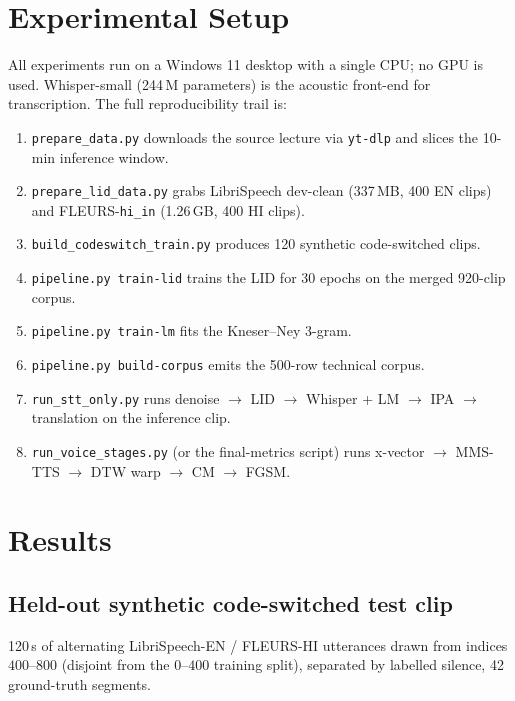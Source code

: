 \documentclass[conference]{IEEEtran}
\begin{document}
\section{Experimental Setup}
All experiments run on a Windows 11 desktop with a single CPU; no
GPU is used. Whisper-small (244\,M parameters) is the acoustic
front-end for transcription. The full reproducibility trail is:

\begin{enumerate}\itemsep1pt
\item \texttt{prepare\_data.py} downloads the source lecture via
      \texttt{yt-dlp} and slices the 10-min inference window.
\item \texttt{prepare\_lid\_data.py} grabs LibriSpeech dev-clean (337\,MB, 400 EN clips) and FLEURS-\texttt{hi\_in} (1.26\,GB, 400 HI clips).
\item \texttt{build\_codeswitch\_train.py} produces 120 synthetic code-switched clips.
\item \texttt{pipeline.py train-lid} trains the LID for 30 epochs
      on the merged 920-clip corpus.
\item \texttt{pipeline.py train-lm} fits the Kneser--Ney 3-gram.
\item \texttt{pipeline.py build-corpus} emits the 500-row technical corpus.
\item \texttt{run\_stt\_only.py} runs denoise $\to$ LID $\to$ Whisper + LM $\to$ IPA $\to$ translation on the inference clip.
\item \texttt{run\_voice\_stages.py} (or the final-metrics script) runs x-vector $\to$ MMS-TTS $\to$ DTW warp $\to$ CM $\to$ FGSM.
\end{enumerate}

\section{Results}
\label{sec:cm-results}

\subsection{Held-out synthetic code-switched test clip}
120\,s of alternating LibriSpeech-EN / FLEURS-HI utterances drawn
from indices $400$--$800$ (disjoint from the $0$--$400$ training
split), separated by labelled silence, 42 ground-truth segments.
\end{document}
